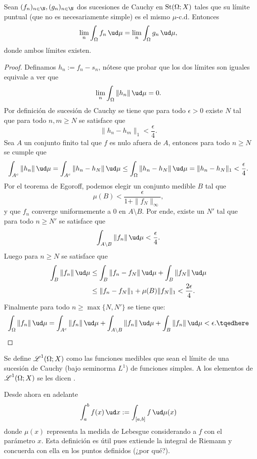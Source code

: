 \begin{lem}
	Sean $(f_n)_{n\in\N}, (g_n)_{n\in\N}$ dos sucesiones de Cauchy en $\operatorname{St}(\Omega; X)$ tales que su límite puntual (que no es necesariamente simple)
	es el mismo $\mu$-c.d. Entonces
	$$ \lim_n \int_\Omega f_n \, \ud\mu = \lim_n \int_\Omega g_n \, \ud\mu, $$
	donde ambos límites existen.
\end{lem}
\begin{proof}
	Definamos $h_n := f_n - s_n$, nótese que probar que los dos límites son iguales equivale a ver que 
	$$ \lim_n \int_\Omega \|h_n\| \, \ud\mu = 0. $$
	Por definición de sucesión de Cauchy se tiene que para todo $\epsilon > 0$ existe $N$ tal que para todo $n, m \ge N$ se satisface que
	$$ \| h_n - h_m \|_1 < \frac{\epsilon}{4}. $$
	Sea $A$ un conjunto finito tal que $f$ es nulo afuera de $A$, entonces para todo $n \ge N$ se cumple que
	$$ \int_{A^c} \| h_n \| \, \ud\mu = \int_{A^c} \| h_n - h_N \| \, \ud\mu \le \int_\Omega \| h_n - h_N \| \, \ud\mu = \|h_n - h_N\|_1 < \frac{\epsilon}{4}. $$
	Por el teorema de Egoroff, podemos elegir un conjunto medible $B$ tal que
	$$ \mu(B) < \frac{\epsilon}{1 + \|f_N\|_\infty}, $$
	y que $f_n$ converge uniformemente a $0$ en $A \setminus B$.
	Por ende, existe un $N'$ tal que para todo $n\ge N'$ se satisface que
	$$ \int_{A\setminus B} \|f_n\| \, \ud\mu < \frac{\epsilon}{4}. $$
	Luego para $n \ge N$ se satisface que
	\begin{align*}
		\int_B \|f_n\| \, \ud\mu &\le \int_B \|f_n - f_N\| \, \ud\mu + \int_B \|f_N\| \, \ud\mu \\
		&\le \|f_n - f_N\|_1 + \mu(B) \|f_N\|_1 < \frac{2\epsilon}{4}.
	\end{align*}
	Finalmente para todo $n \ge \max\{ N, N' \}$ se tiene que:
	\begin{equation}
		\int_\Omega \|f_n\| \, \ud\mu = \int_{A^c} \|f_n\| \, \ud\mu + \int_{A \setminus B} \|f_n\| \, \ud\mu + \int_B \|f_n\| \, \ud\mu < \epsilon.
		\tqedhere
	\end{equation}
\end{proof}
\begin{mydefi}
	Se define $\operatorname{\mathscr{L}}^1(\Omega; X)$ como las funciones medibles que sean el límite de una sucesión de Cauchy (bajo seminorma $L^1$) de funciones simples.
	A los elementos de $\operatorname{\mathscr{L}}^1(\Omega; X)$ se les dicen .
\end{mydefi}

Desde ahora en adelante
$$ \int_a^b f(x)\,\ud x := \int_{[a,b]} f\,\ud\mu(x) $$
donde $\mu(x)$ representa la medida de Lebesgue considerando a $f$ con el parámetro $x$.
Esta definición es útil pues extiende la integral de Riemann y concuerda con ella en los puntos definidos (¿por qué?).

